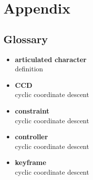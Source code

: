 \appendix \chapter{Appendix}\label{chap:appendix}

\section{Glossary}

\begin{itemize}[\null]

\item \textbf{articulated character} \\
definition

\item \textbf{CCD} \\
cyclic coordinate descent

\item \textbf{constraint} \\
cyclic coordinate descent

\item \textbf{controller} \\
cyclic coordinate descent

\item \textbf{keyframe} \\
cyclic coordinate descent

\end{itemize}